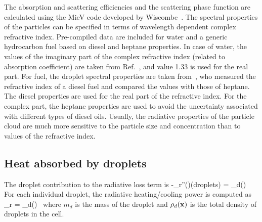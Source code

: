 The absorption and scattering efficiencies and the scattering phase
function are calculated using the MieV code developed by Wiscombe~\cite{Wiscombe}.
The spectral properties of the particles can be specified in terms of wavelength dependent complex refractive index.
Pre-compiled data are included for water and a generic hydrocarbon fuel based on diesel and heptane properties.
In case of water, the values of the imaginary part of the complex refractive index (related to absorption coefficient) are taken from
Ref.~\cite{Hale:1}, and value 1.33 is used for the real part.
For fuel, the droplet spectral properties are taken from~\cite{Dombrovsky:1}, who measured the refractive index
of a diesel fuel and compared the values with those of heptane. The diesel properties are used for the real part of the refractive index. For the complex
part, the heptane properties are used to avoid the uncertainty associated with different types of diesel oils. Usually, the radiative properties
of the particle cloud are much more sensitive to the particle size and concentration than to values of the refractive index.




\subsection{Heat absorbed by droplets}

The droplet contribution to the radiative
loss term is
\be -\nabla\!\cdot \dbq_r''(\bx)(\mbox{droplets}) =
    \kappa_d(\bx) \, \left[ U(\bx) - 4 \pi \, I_{b,d}(\bx) \right]
\ee
For each individual droplet, the radiative heating/cooling power is
computed as
\be
\dq_r = 
    \kappa_d(\bx) \, \left[ U(\bx) - 4\pi \, I_{b,d}(\bx) \right]
\ee
where $m_d$ is the mass of the droplet and $\rho_d({\bf x})$ is the total
density of droplets in the cell.\\





